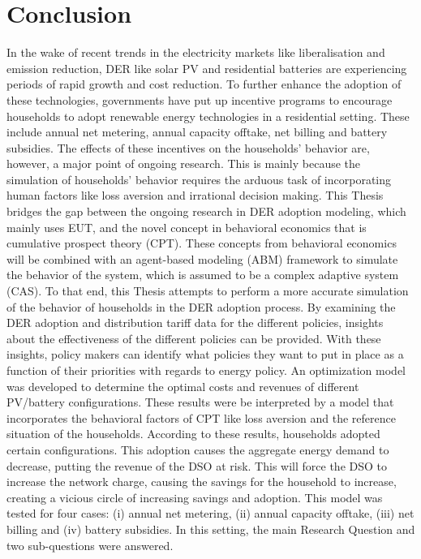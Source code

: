 \chapter{Conclusion}
In the wake of recent trends in the electricity markets like liberalisation and emission reduction, DER like solar PV and residential batteries are experiencing periods of rapid growth and cost reduction. To further enhance the adoption of these technologies, governments have put up incentive programs to encourage households to adopt renewable energy technologies in a residential setting. These include annual net metering, annual capacity offtake, net billing and battery subsidies. The effects of these incentives on the households' behavior are, however, a major point of ongoing research. This is mainly because the simulation of households' behavior requires the arduous task of incorporating human factors like loss aversion and irrational decision making. This Thesis bridges the gap between the ongoing research in DER adoption modeling, which mainly uses EUT, and the novel concept in behavioral economics that is cumulative prospect theory (CPT).
These concepts from behavioral economics will be combined with an agent-based modeling (ABM) framework to simulate the behavior of the system, which is assumed to be a complex adaptive system (CAS). To that end, this Thesis attempts to perform a more accurate simulation of the behavior of households in the DER adoption process. By examining the DER adoption and distribution tariff data for the different policies, insights about the effectiveness of the different policies can be provided. With these insights, policy makers can identify what policies they want to put in place as a function of their priorities with regards to energy policy. 
\newline \newline \noindent
An optimization model was developed to determine the optimal costs and revenues of different PV/battery configurations. These results were be interpreted by a model that incorporates the behavioral factors of CPT like loss aversion and the reference situation of the households. According to these results, households adopted certain configurations. This adoption causes the aggregate energy demand to decrease, putting the revenue of the DSO at risk. This will force the DSO to increase the network charge, causing the savings for the household to increase, creating a vicious circle of increasing savings and adoption. This model was tested for four cases: (i) annual net metering, (ii) annual capacity offtake, (iii) net billing and (iv) battery subsidies. In this setting, the main Research Question and two sub-questions were answered.
